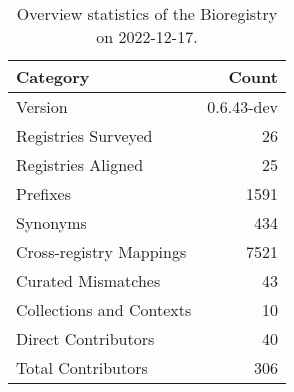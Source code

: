 \begin{table}
\centering
\caption{Overview statistics of the Bioregistry on 2022-12-17.}
\label{tab:bioregistry-summary}
\begin{tabular}{lr}
\toprule
                Category &      Count \\
\midrule
                 Version & 0.6.43-dev \\
     Registries Surveyed &         26 \\
      Registries Aligned &         25 \\
                Prefixes &       1591 \\
                Synonyms &        434 \\
 Cross-registry Mappings &       7521 \\
      Curated Mismatches &         43 \\
Collections and Contexts &         10 \\
     Direct Contributors &         40 \\
      Total Contributors &        306 \\
\bottomrule
\end{tabular}
\end{table}
